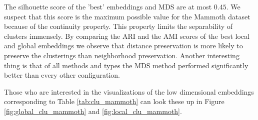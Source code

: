 The silhouette score of the 'best' embeddings and MDS are at most $0.45$. We suspect that this score is the maximum possible value for the Mammoth dataset because of the continuity property. This property limits the separability of clusters immensely.
By comparing the ARI and the AMI scores of the best local and global embeddings we observe that distance preservation is more likely to preserve the clusterings than neighborhood preservation. Another interesting thing is that of all methods and types the MDS method performed significantly better than every other configuration.

Those who are interested in the visualizations of the low dimensional embeddings corresponding to Table \ref{tab:clu_mammoth} can look these up in Figure \ref{fig:global_clu_mammoth} and \ref{fig:local_clu_mammoth}.

